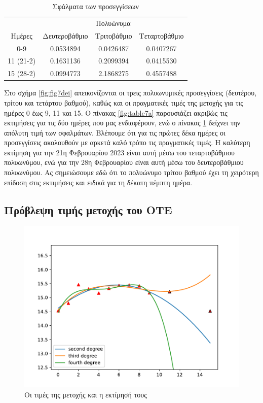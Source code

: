 \documentclass[a4paper,11pt]{article}
\begin{document}
\begin{table}[h!]
\centering
\begin{tabular}{c c c c}
    & \multicolumn{3}{c}{Πολυώνυμα} \\
   Ημέρες & Δευτεροβάθμιο & Τριτοβάθμιο & Τεταρτοβάθμιο \\
   0-9 & 0.0534894 & 0.0426487 & 0.0407267 \\
   11 (21-2) & 0.1631136 & 0.2099394 & 0.0415530 \\
   15 (28-2) & 0.0994773 & 2.1868275 & 0.4557488 \\
\end{tabular}
\caption{Σφάλματα των προσεγγίσεων}
\label{fig:table7b}
\end{table}

Στο σχήμα \ref{fig:fig7dei} απεικονίζονται οι τρεις πολυωνυμικές προσεγγίσεις (δευτέρου, τρίτου και τετάρτου βαθμού), καθώς και οι πραγματικές τιμές της μετοχής για τις ημέρες 0 έως 9, 11 και 15. Ο πίνακας \ref{fig:table7a} παρουσιάζει ακριβώς τις εκτιμήσεις για τις δύο ημέρες που μας ενδιαφέρουν, ενώ ο πίνακας \ref{fig:table7b} δείχνει την απόλυτη τιμή των σφαλμάτων.  Βλέπουμε ότι για τις πρώτες δέκα ημέρες οι προσεγγίσεις ακολουθούν με αρκετά καλό τρόπο τις πραγματικές τιμές. Η καλύτερη εκτίμηση για την 21η Φεβρουαρίου 2023 είναι αυτή μέσω του τεταρτοβάθμιου πολυωνύμου, ενώ για την 28η Φεβρουαρίου είναι αυτή μέσω του δευτεροβάθμιου πολυωνύμου. Ας σημειώσουμε εδώ ότι το πολυώνυμο τρίτου βαθμού έχει τη χειρότερη επίδοση στις εκτιμήσεις και ειδικά για τη δέκατη πέμπτη ημέρα.

\subsection{Πρόβλεψη τιμής μετοχής του ΟΤΕ}

\begin{figure}[h!]
    \centering
    \includegraphics[width=0.8\linewidth]{images/figure7_ote.pdf}
    \centering
     \caption{Οι τιμές της μετοχής και η εκτίμησή τους}
    \label{fig:fig7ote}
\end{figure}
\end{document}
